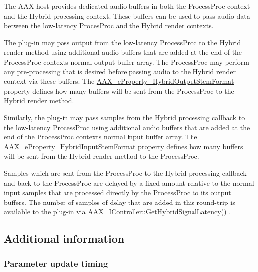 The A\+AX host provides dedicated audio buffers in both the Process\+Proc context and the Hybrid processing context. These buffers can be used to pass audio data between the low-\/latency Proces\+Proc and the Hybrid render contexts. \begin{DoxyItemize}
\item The plug-\/in may pass output from the low-\/latency Process\+Proc to the Hybrid render method using additional audio buffers that are added at the end of the Process\+Proc context\textquotesingle{}s normal output buffer array. The Process\+Proc may perform any pre-\/processing that is desired before passing audio to the Hybrid render context via these buffers. The \mbox{\hyperlink{a00805_ga13e384f22825afd3db6d68395b79ce0dac30a4e73772e37267dfef39ae3122705}{A\+A\+X\+\_\+e\+Property\+\_\+\+Hybrid\+Output\+Stem\+Format}} property defines how many buffers will be sent from the Process\+Proc to the Hybrid render method. \item Similarly, the plug-\/in may pass samples from the Hybrid processing callback to the low-\/latency Process\+Proc using additional audio buffers that are added at the end of the Process\+Proc context\textquotesingle{}s normal input buffer array. The \mbox{\hyperlink{a00805_ga13e384f22825afd3db6d68395b79ce0da33a950bc2e02d38fc3be0a0ad8cc89b1}{A\+A\+X\+\_\+e\+Property\+\_\+\+Hybrid\+Input\+Stem\+Format}} property defines how many buffers will be sent from the Hybrid render method to the Process\+Proc.\end{DoxyItemize}
Samples which are sent from the Process\+Proc to the Hybrid processing callback and back to the Process\+Proc are delayed by a fixed amount relative to the normal input samples that are processed directly by the Process\+Proc to its output buffers. The number of samples of delay that are added in this round-\/trip is available to the plug-\/in via \mbox{\hyperlink{a00805_ga47b471c438fcad0798964b860d74609e}{A\+A\+X\+\_\+\+I\+Controller\+::\+Get\+Hybrid\+Signal\+Latency()}} .\hypertarget{a00805_additionalFeatures_Hybrid_subtleties}{}\subsection{Additional information}\label{a00805_additionalFeatures_Hybrid_subtleties}
\hypertarget{a00805_additionalFeatures_Hybrid_parametertiming}{}\subsubsection{Parameter update timing}\label{a00805_additionalFeatures_Hybrid_parametertiming}
